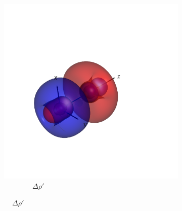 \documentclass[journal=inoraj,manuscript=article]{achemso}
\begin{document}
\begin{figure}[!h]
    \centering
    \centering
    \begin{subfigure}[t]{0.33\textwidth}
        \centering
        \includegraphics[width=\linewidth]{./AuPb+/diff_tot.png} 
        \caption*{\ \ \ \ \ \ \ \ $\Delta \rho'$} 
    \end{subfigure}
    \hfill
 

\end{figure}
\end{document}
